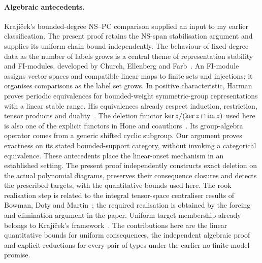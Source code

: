 \documentclass[11pt,a4paper]{article}
\theoremstyle{definition}\newtheorem{definition}[theorem]{Definition}
\theoremstyle{remark}\newtheorem{remark}[theorem]{Remark}
\begin{document}
\paragraph{Algebraic antecedents.}
Kraj\'i\v cek's bounded-degree NS--PC comparison
\cite[Theorem~5.5]{Krajicek}
supplied an input to my earlier classification. The present proof
retains the NS-span stabilisation argument and supplies its uniform
chain bound independently. The behaviour of fixed-degree data as the
number of labels grows is a central theme of representation stability
and FI-modules, developed by Church, Ellenberg and Farb~\cite{CEF}.
An FI-module assigns vector spaces and compatible linear maps to finite
sets and injections; it organises comparisons as the label set grows. In positive
characteristic, Harman~\cite{Harman} proves periodic equivalences for
bounded-weight symmetric-group representations with a linear stable
range. His equivalences already respect induction, restriction, tensor
products and duality~\cite[Propositions~2.7 and~2.12]{Harman}.
The deletion functor $\ker z/(\ker z\cap\operatorname{im} z)$ used here is also
one of the explicit functors in Hone and coauthors~\cite[Theorem~A]{HKPSYZ}.
Its group-algebra operator comes from a generic shifted cyclic subgroup.
Our argument proves exactness on its stated bounded-support category,
without invoking a categorical equivalence. These antecedents place
the linear-onset mechanism in an established setting. The
present proof independently constructs exact deletion on the actual
polynomial diagrams, preserves their consequence closures and detects
the prescribed targets, with the quantitative bounds used here. The rook
realisation step is related to the integral tensor-space centraliser
results of Bowman, Doty and Martin~\cite{BDM}; the required realisation
is obtained by the forcing and elimination argument in the paper.
Uniform target membership already belongs to Kraj\'i\v cek's
framework~\cite{KrajEuler,Krajicek}. The contributions here are the
linear quantitative bounds for uniform consequences, the independent
algebraic proof and explicit reductions for every pair of types under
the earlier no-finite-model promise.
\end{document}
